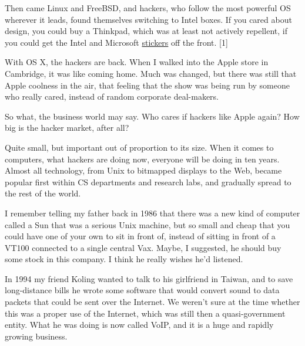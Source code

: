 Then came Linux and
                  FreeBSD, and hackers, who follow the most powerful OS wherever
                  it leads, found themselves switching to Intel boxes. If you
                  cared about design, you could buy a Thinkpad, which was at
                  least not actively repellent, if you could get the Intel and
                  Microsoft \href{http://www.paulgraham.com/designedforwindows.html}{stickers} off
                  the front. [1]

With OS X, the hackers are back.
                  When I walked into the Apple store in Cambridge, it was like
                  coming home. Much was changed, but there was still that Apple
                  coolness in the air, that feeling that the show was being run
                  by someone who really cared, instead of random corporate
                  deal-makers.

So what, the business world may say.
                  Who cares if hackers like Apple again? How big is the hacker
                  market, after all?

Quite small, but important out
                  of proportion to its size. When it comes to computers, what
                  hackers are doing now, everyone will be doing in ten years.
                  Almost all technology, from Unix to bitmapped displays to the
                  Web, became popular first within CS departments and research
                  labs, and gradually spread to the rest of the world.

I
                  remember telling my father back in 1986 that there was a new
                  kind of computer called a Sun that was a serious Unix machine,
                  but so small and cheap that you could have one of your own to
                  sit in front of, instead of sitting in front of a VT100
                  connected to a single central Vax. Maybe, I suggested, he
                  should buy some stock in this company. I think he really
                  wishes he'd listened.

In 1994 my friend Koling
                  wanted to talk to his girlfriend in Taiwan, and to save
                  long-distance bills he wrote some software that would convert
                  sound to data packets that could be sent over the Internet. We
                  weren't sure at the time whether this was a proper use of the
                  Internet, which was still then a quasi-government entity. What
                  he was doing is now called VoIP, and it is a huge and rapidly
                  growing business.

